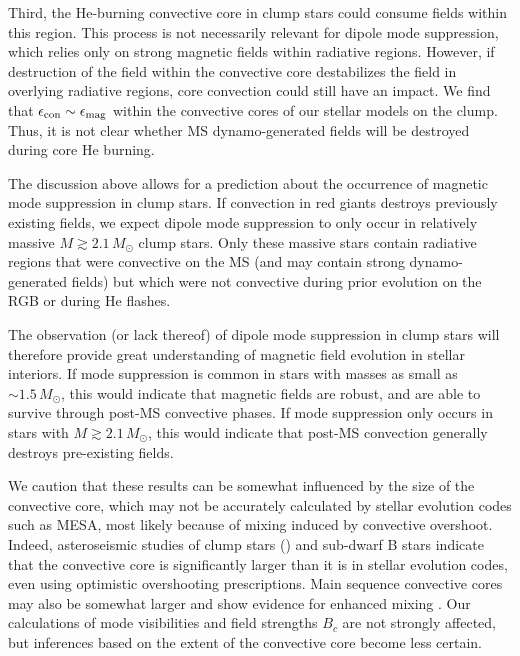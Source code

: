 Third, the He-burning convective core in clump stars could consume fields within this region. This process is not necessarily relevant for dipole mode suppression, which relies only on strong magnetic fields within radiative regions. However, if destruction of the field within the convective core destabilizes the field in overlying radiative regions, core convection could still have an impact. We find that $\epsilon_{\rm con} \sim \epsilon_{\rm mag}$ within the convective cores of our stellar models on the clump. Thus, it is not clear whether MS dynamo-generated fields will be destroyed during core He burning. 

The discussion above allows for a prediction about the occurrence of magnetic mode suppression in clump stars. If convection in red giants destroys previously existing fields, we expect dipole mode suppression to only occur in relatively massive $M \gtrsim 2.1 \, M_\odot$ clump stars. Only these massive stars contain radiative regions that were convective on the MS (and may contain strong dynamo-generated fields) but which were not convective during prior evolution on the RGB or during He flashes. 

The observation (or lack thereof) of dipole mode suppression in clump stars will therefore provide great understanding of magnetic field evolution in stellar interiors. If mode suppression is common in stars with masses as small as $\sim \! 1.5 \, M_\odot$, this would indicate that magnetic fields are robust, and are able to survive through post-MS convective phases. If mode suppression only occurs in stars with $M \gtrsim 2.1 \, M_\odot$, this would indicate that post-MS convection generally destroys pre-existing fields. 

We caution that these results can be somewhat influenced by the size of the convective core, which may not be accurately calculated by stellar evolution codes such as MESA, most likely because of mixing induced by convective overshoot. Indeed, asteroseismic studies of clump stars (\cite{montalban_2013,stello_2013,mosser_2014,bossini_2015,constantino_2015}) and sub-dwarf B stars \citep{vangrootel_2010a,vangrootel_2010b,charpinet_2011,Schindler_2015} indicate that the convective core is significantly larger than it is in stellar evolution codes, even using optimistic overshooting prescriptions. Main sequence convective cores may also be somewhat larger and show evidence for enhanced mixing \citep{moravveji_2015}.  Our calculations of mode visibilities and field strengths $B_c$ are not strongly affected, but inferences based on the extent of the convective core become less certain.
    
    